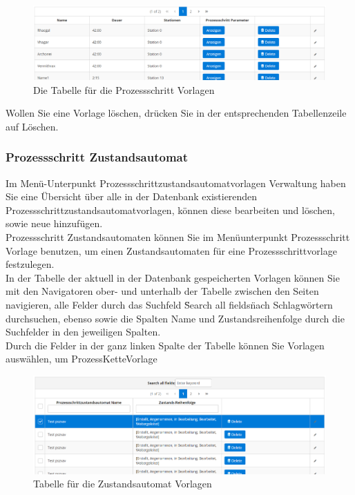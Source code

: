 \documentclass[enabledeprecatedfontcommands,fontsize=12pt,paper=a4,twoside]{scrartcl}
\begin{document}
\begin{figure}[h!]
\begin{center}
 \includegraphics[width=\textwidth]{screenshots/pk/prozessschrittvorlagetabelle.png}
  \caption{Die Tabelle für die Prozessschritt Vorlagen}
  \label{fig:boat2}
\end{center}
\end{figure}


Wollen Sie eine Vorlage löschen, drücken Sie in der entsprechenden Tabellenzeile auf Löschen. \\


\subsubsection{Prozessschritt Zustandsautomat}

Im Menü-Unterpunkt Prozessschrittzustandsautomatvorlagen Verwaltung haben Sie eine Übersicht über alle in der Datenbank existierenden Prozessschrittzustandsautomatvorlagen, können diese bearbeiten und löschen, sowie neue hinzufügen. \\

Prozessschritt Zustandsautomaten können Sie im Menüunterpunkt Prozessschritt Vorlage benutzen, um einen Zustandsautomaten für eine Prozessschrittvorlage festzulegen. \\

In der Tabelle der aktuell in der Datenbank gespeicherten Vorlagen können Sie mit den Navigatoren ober- und unterhalb der Tabelle zwischen den Seiten navigieren, alle Felder durch das Suchfeld \"Search all fields\" nach Schlagwörtern durchsuchen, ebenso sowie die Spalten Name und Zustandsreihenfolge durch die Suchfelder in den jeweiligen Spalten. \\
Durch die Felder in der ganz linken Spalte der Tabelle können Sie Vorlagen auswählen, um ProzessKetteVorlage\\

\begin{figure}[h!]
\begin{center}
 \includegraphics[width=\textwidth]{screenshots/pk/zustandsautomattabelle.png}
  \caption{Tabelle für die Zustandsautomat Vorlagen}
  \label{fig:boat2}
\end{center}
\end{figure}
\end{document}
